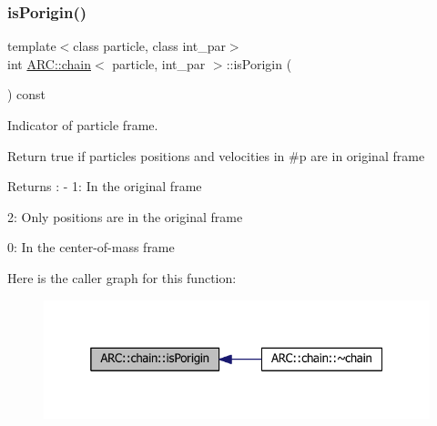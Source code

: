 \subsubsection{\texorpdfstring{is\+Porigin()}{isPorigin()}}
{\footnotesize\ttfamily template$<$class particle, class int\+\_\+par$>$ \\
int \hyperlink{classARC_1_1chain}{A\+R\+C\+::chain}$<$ particle, int\+\_\+par $>$\+::is\+Porigin (\begin{DoxyParamCaption}{ }\end{DoxyParamCaption}) const\hspace{0.3cm}{\ttfamily [inline]}}



Indicator of particle frame. 

Return true if particles positions and velocities in \#p are in original frame \begin{DoxyReturn}{Returns}
\+: -\/ 1\+: In the original frame
\begin{DoxyItemize}
\item 2\+: Only positions are in the original frame
\item 0\+: In the center-\/of-\/mass frame 
\end{DoxyItemize}
\end{DoxyReturn}
Here is the caller graph for this function\+:
\nopagebreak
\begin{figure}[H]
\begin{center}
\leavevmode
\includegraphics[width=325pt]{classARC_1_1chain_a7de218a1874b150ee44a05aa9d7b7b6d_icgraph}
\end{center}
\end{figure}
\hypertarget{classARC_1_1chain_aff3cd92c840d1bbbc903a8a07eb079d0}{}\label{classARC_1_1chain_aff3cd92c840d1bbbc903a8a07eb079d0} 
